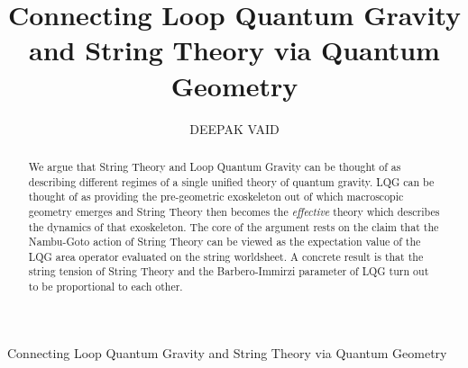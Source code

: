 \documentclass{ws-mpla}
\begin{document}
{Connecting Loop Quantum Gravity and String Theory via Quantum Geometry}

\catchline{}{}{}{}{}

\title{Connecting Loop Quantum Gravity and String Theory via Quantum Geometry}


\author{\footnotesize DEEPAK VAID}

\address{Department of Physics, \\ National Institute of Technology Karnataka (NITK), India\\
Mangaluru, Karnataka - 575025 \\
India \\
dvaid79@gmail.com}

%

\maketitle


\begin{abstract}
We argue that String Theory and Loop Quantum Gravity can be thought of as describing different regimes of a single unified theory of quantum gravity. LQG can be thought of as providing the pre-geometric exoskeleton out of which macroscopic geometry emerges and String Theory then becomes the \emph{effective} theory which describes the dynamics of that exoskeleton. The core of the argument rests on the claim that the Nambu-Goto action of String Theory can be viewed as the expectation value of the LQG area operator evaluated on the string worldsheet. A concrete result is that the string tension of String Theory and the Barbero-Immirzi parameter of LQG turn out to be proportional to each other.
\end{abstract}

\end{document}
